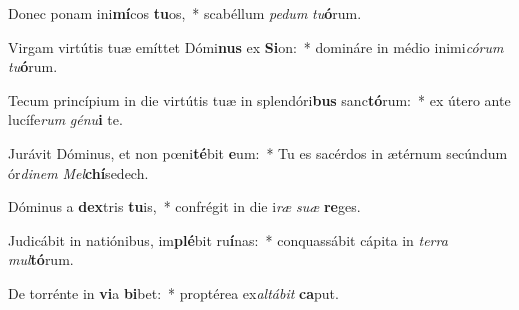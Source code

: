 \item Donec ponam ini\textbf{mí}cos \textbf{tu}os,~* scabéllum \textit{pe}\textit{dum} \textit{tu}\textbf{ó}rum.
\item Virgam virtútis tuæ emíttet Dómi\textbf{nus} ex \textbf{Si}on:~* domináre in médio inimi\textit{có}\textit{rum} \textit{tu}\textbf{ó}rum.
\item Tecum princípium in die virtútis tuæ in splendóri\textbf{bus} sanc\textbf{tó}rum:~* ex útero ante lucífe\textit{rum} \textit{gé}\textit{nu}\textbf{i} te.
\item Jurávit Dóminus, et non pœni\textbf{té}bit \textbf{e}um:~* Tu es sacérdos in ætérnum secúndum ór\textit{di}\textit{nem} \textit{Mel}\textbf{chí}sedech.
\item Dóminus a \textbf{dex}tris \textbf{tu}is,~* confrégit in die i\textit{ræ} \textit{su}\textit{æ} \textbf{re}ges.
\item Judicábit in natiónibus, im\textbf{plé}bit ru\textbf{í}nas:~* conquassábit cápita in \textit{ter}\textit{ra} \textit{mul}\textbf{tó}rum.
\item De torrénte in \textbf{vi}a \textbf{bi}bet:~* proptérea ex\textit{al}\textit{tá}\textit{bit} \textbf{ca}put.
